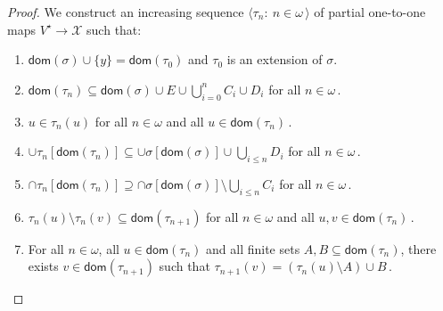 \documentclass[10pt,a4paper, openany,  oldfontcommands]{memoir}
\newtheorem{open problem} [theorem] {Open Problem}
\begin{document}
\begin{proof}
We construct an increasing sequence   $   \langle   \tau_n  :   \   n  \in  \omega   \,  \rangle  $  of partial one-to-one maps  
$  V^{  \star }  \to   \mathcal{X} $  such that: 
\begin{enumerate}
\item   $  \mathsf{dom} \left(  \sigma   \right)   \cup    \lbrace y  \rbrace  =     \mathsf{dom} \left(  \tau_0   \right)   $  
and  $  \tau_0 $  is an extension of  $  \sigma  $. 





\item    $    \mathsf{dom} \left(  \tau_{n}    \right)     \subseteq   
 \mathsf{dom} \left(  \sigma    \right)    \cup  E   \cup   \bigcup_{ i = 0 }^{ n }   C_i  \cup  D_i  $  
 for all $  n  \in  \omega        \,    $. 
 
 
 

\item   $  u  \in  \tau_n (u)  $  for all $  n   \in  \omega $  and all $  u  \in   \mathsf{dom} \left(  \tau_n  \right)      \,     $. 



\item  $  \cup    \tau_n  \left[   \mathsf{dom} \left(  \tau_n  \right)   \right]  
 \subseteq   
 \cup    \sigma  \left[   \mathsf{dom} \left(  \sigma  \right)   \right]  
 \cup   \bigcup_{ i \leq   n  }    D_i   
 $
 for all  $  n  \in  \omega      \,    $. 
 
 
 
 \item  $  \cap    \tau_n  \left[   \mathsf{dom} \left(  \tau_n  \right)   \right]  
  \supseteq   
 \cap    \sigma  \left[   \mathsf{dom} \left(  \sigma  \right)   \right]  
 \setminus     \bigcup_{ i \leq   n  }    C_i     
 $
 for all  $  n  \in  \omega      \,    $. 





\item   $   \tau_n (u)   \setminus  \tau_n (v)    \subseteq    \mathsf{dom} \left(  \tau_{n+1}   \right)          $
for  all   $  n  \in  \omega  $   and    all $ u, v    \in   \mathsf{dom} \left(  \tau_n   \right)        \,    $.
 


\item For all $  n  \in  \omega  $,   all $ u  \in   \mathsf{dom} \left(  \tau_n   \right)  $  and all finite sets   $  A, B   \subseteq   \mathsf{dom} \left(  \tau_n   \right)   $, 
there exists  $  v  \in  \mathsf{dom} \left(  \tau_{n+1}   \right)    $  such that 
$  \tau_{ n+1}  \left(  v  \right)  =   \left(    \tau_n (u)   \setminus  A  \right)   \cup   B         \,     $. 



\end{enumerate}
\end{proof}
\end{document}
